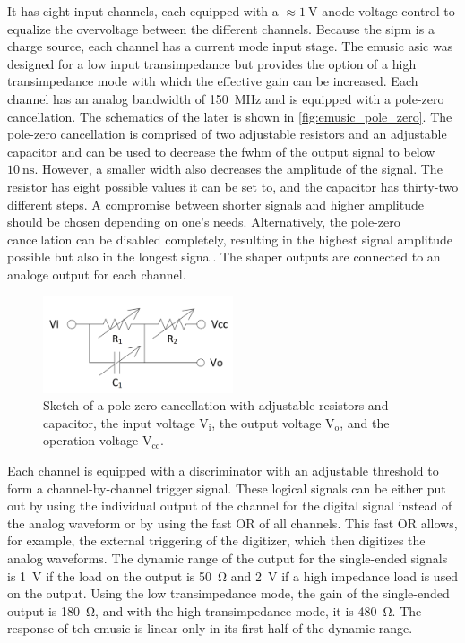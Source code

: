 It has eight input channels, each equipped with a $\approx\SI{1}{\volt}$ anode voltage control to equalize the overvoltage between the different channels.
Because the \ac{sipm} is a charge source, each channel has a current mode input stage.
The \ac{emusic} \ac{asic} was designed for a low input transimpedance but provides the option of a high transimpedance mode with which the effective gain can be increased.
Each channel has an analog bandwidth of \SI{150}{\mega\hertz} and is equipped with a pole-zero cancellation. 
The schematics of the later is shown in \autoref{fig:emusic_pole_zero}.
The pole-zero cancellation is comprised of two adjustable resistors and an adjustable capacitor and can be used to decrease the \ac{fwhm} of the output signal to below $\SI{10}{\nano\second}$.
However, a smaller width also decreases the amplitude of the signal.
The resistor has eight possible values it can be set to, and the capacitor has thirty-two different steps.
A compromise between shorter signals and higher amplitude should be chosen depending on one's needs.
Alternatively, the pole-zero cancellation can be disabled completely, resulting in the highest signal amplitude possible but also in the longest signal.
The shaper outputs are connected to an analoge output for each channel.
\begin{figure}
	\centering
	\includegraphics[width=0.5\textwidth]{pictures/emusic_pole_zero.png}
	\caption[eMUSIC pole-zero cancellation]{Sketch of a pole-zero cancellation with adjustable resistors and capacitor, the input voltage $\text{V}_\text{i}$, the output voltage $\text{V}_\text{o}$, and the operation voltage $\text{V}_\text{cc}$. \cite{electronics10080961}}
	\label{fig:emusic_pole_zero}
\end{figure}

Each channel is equipped with a discriminator with an adjustable threshold to form a channel-by-channel trigger signal.
These logical signals can be either put out by using the individual output of the channel for the digital signal instead of the analog waveform or by using the fast OR of all channels.
This fast OR allows, for example, the external triggering of the digitizer, which then digitizes the analog waveforms.
The dynamic range of the output for the single-ended signals is \SI{1}{\volt} if the load on the output is \SI{50}{\ohm} and \SI{2}{\volt} if a high impedance load is used on the output.
Using the low transimpedance mode, the gain of the single-ended output is \SI{180}{\ohm}, and with the high transimpedance mode, it is \SI{480}{\ohm}.
The response of teh \ac{emusic} is linear only in its first half of the dynamic range.

